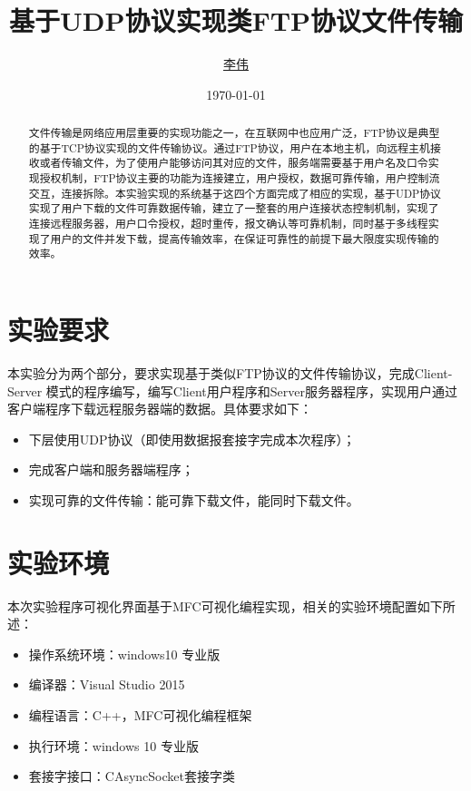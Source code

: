 \documentclass[lang=cn,11pt]{elegantpaper}
\title{基于UDP协议实现类FTP协议文件传输}
\author{\href{https://github.com/Jack-Lio}{李伟}}
\institute{1711350   计算机科学与技术一班}
\date{\today}
\begin{document}
\maketitle

\begin{abstract}
\noindent 文件传输是网络应用层重要的实现功能之一，在互联网中也应用广泛，FTP协议是典型的基于TCP协议实现的文件传输协议。通过FTP协议，用户在本地主机，向远程主机接收或者传输文件，为了使用户能够访问其对应的文件，服务端需要基于用户名及口令实现授权机制，FTP协议主要的功能为连接建立，用户授权，数据可靠传输，用户控制流交互，连接拆除。本实验实现的系统基于这四个方面完成了相应的实现，基于UDP协议实现了用户下载的文件可靠数据传输，建立了一整套的用户连接状态控制机制，实现了连接远程服务器，用户口令授权，超时重传，报文确认等可靠机制，同时基于多线程实现了用户的文件并发下载，提高传输效率，在保证可靠性的前提下最大限度实现传输的效率。
\end{abstract}


\section{实验要求}


本实验分为两个部分，要求实现基于类似FTP协议的文件传输协议，完成Client-Server 模式的程序编写，编写Client用户程序和Server服务器程序，实现用户通过客户端程序下载远程服务器端的数据。具体要求如下：

\begin{itemize}
	\item 下层使用UDP协议（即使用数据报套接字完成本次程序）；
	\item 完成客户端和服务器端程序；
	\item 实现可靠的文件传输：能可靠下载文件，能同时下载文件。
\end{itemize}

\section{实验环境}
本次实验程序可视化界面基于MFC可视化编程实现，相关的实验环境配置如下所述：

\begin{itemize}
	\item 操作系统环境：windows10 专业版
	\item 编译器：Visual Studio 2015
	\item 编程语言：C++，MFC可视化编程框架
	\item 执行环境：windows 10 专业版
	\item 套接字接口：CAsyncSocket套接字类
\end{itemize}
\end{document}
